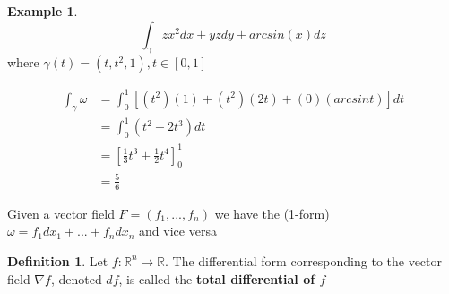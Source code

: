 \documentclass[12pt]{article}
\theoremstyle{plain}
\theoremstyle{definition}
\newtheorem{definition}[theorem]{Definition}
\newtheorem{example}[theorem]{Example}
\begin{document}
\begin{example}
	$$\int_\gamma zx^2 dx + yzdy + arcsin(x)dz$$
	where $\gamma (t) = (t, t^2, 1), t\in [0,1]$
	
	\begin{align*}
		\int_\gamma \omega &= \int_0^1 [(t^2)(1) + (t^2)(2t) + (0)(arcsint) ]dt\\
		&= \int_0^1 (t^2+ 2t^3)dt\\
		&= [\frac{1}{3} t^3 + \frac{1}{2} t^4]_0^1\\
		&=\frac{5}{6}
	\end{align*}

\end{example}

Given a vector field $F=(f_1, ...,f_n)$ we have the (1-form) $\omega = f_1 dx_1 + ... + f_n dx_n$ and vice versa

\begin{definition}
	Let $f:\mathbb{R}^n \mapsto \mathbb{R}$. The differential form corresponding to the vector field $\nabla f$, denoted $df$, is called the \textbf{total differential of $f$}
\end{definition}
\end{document}
